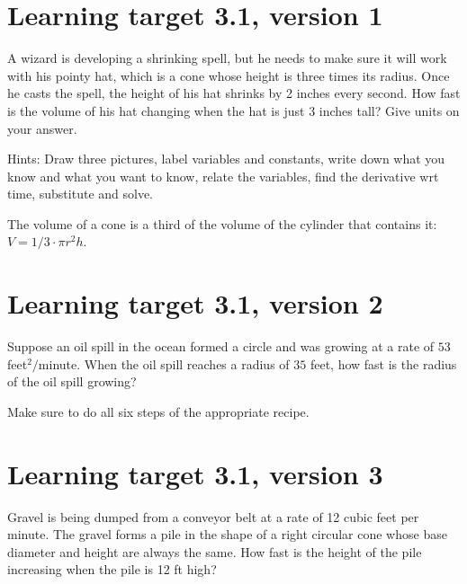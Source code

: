 
\usepackage{pgfplots}


%


\allowdisplaybreaks
\section{Learning target 3.1, version 1}

A wizard is developing a shrinking spell, but he needs to make sure it will work with his pointy hat, which is a cone whose height is three times its radius. Once he casts the spell, the height of his hat shrinks by 2 inches every second. How fast is the volume of his hat changing when the hat is just 3 inches tall? Give units on your answer.

\vspace{1em}

{\tiny Hints: Draw three pictures, label variables and constants, write down what you know and what you want to know, relate the variables, find the derivative wrt time, substitute and solve. 

The volume of a cone is a third of the volume of the cylinder that contains it: $V = 1/3 \cdot \pi r^2 h$.}

\pagebreak

\section{Learning target 3.1, version 2}

Suppose an oil spill in the ocean formed a circle and was growing at a rate of \(53\) feet\(^2/\)minute. When the oil spill reaches a radius of \(35\) feet, how fast is the radius of the oil spill growing? 

\vspace{1em}

Make sure to do all six steps of the appropriate recipe.


\pagebreak
\section{Learning target 3.1, version 3}


Gravel is being dumped from a conveyor belt at a rate of 12 cubic feet per minute. The gravel forms a pile in the shape of a right circular cone whose base diameter and height are always the same. How fast is the height of the pile increasing when the pile is 12 ft high? 



